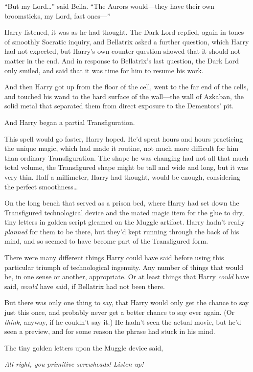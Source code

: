 ``But my Lord\ldots{}'' said Bella. ``The Aurors would---they have their
own broomsticks, my Lord, fast ones---''

Harry listened, it was as he had thought. The Dark Lord replied, again
in tones of smoothly Socratic inquiry, and Bellatrix asked a further
question, which Harry had not expected, but Harry's own counter-question
showed that it should not matter in the end. And in response to
Bellatrix's last question, the Dark Lord only smiled, and said that it
was time for him to resume his work.

And then Harry got up from the floor of the cell, went to the far end of
the cells, and touched his wand to the hard surface of the wall---the
wall of Azkaban, the solid metal that separated them from direct
exposure to the Dementors' pit.

And Harry began a partial Transfiguration.

This spell would go faster, Harry hoped. He'd spent hours and hours
practicing the unique magic, which had made it routine, not much more
difficult for him than ordinary Transfiguration. The shape he was
changing had not all that much total volume, the Transfigured shape
might be tall and wide and long, but it was very thin. Half a
millimeter, Harry had thought, would be enough, considering the perfect
smoothness\ldots{}

On the long bench that served as a prison bed, where Harry had set down
the Transfigured technological device and the mated magic item for the
glue to dry, tiny letters in golden script gleamed on the Muggle
artifact. Harry hadn't really \emph{planned} for them to be there, but
they'd kept running through the back of his mind, and so seemed to have
become part of the Transfigured form.

There were many different things Harry could have said before using this
particular triumph of technological ingenuity. Any number of things that
would be, in one sense or another, appropriate. Or at least things that
Harry \emph{could} have said, \emph{would} have said, if Bellatrix had
not been there.

But there was only one thing to say, that Harry would only get the
chance to say just this once, and probably never get a better chance to
say ever again. (Or \emph{think,} anyway, if he couldn't say it.) He
hadn't seen the actual movie, but he'd seen a preview, and for some
reason the phrase had stuck in his mind.

The tiny golden letters upon the Muggle device said,

\emph{All right, you primitive screwheads! Listen up!}
